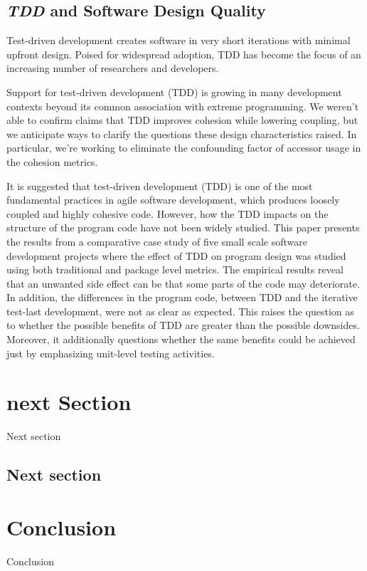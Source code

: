 \documentclass{article}
\begin{document}
\subsection{\textit{TDD} and Software Design Quality}

Test-driven development creates software \cite{TestDrivenDevelopmentConceptsTaxonomy} in very short iterations with minimal upfront design. Poised for widespread adoption, TDD has become the focus of an increasing number of researchers and developers.

Support for test-driven development (TDD) is growing in many development contexts beyond its common association with extreme programming.  We \cite{TestDrivenDevelopmentReallyImproveSoftwareDesign} weren't able to confirm claims that TDD improves cohesion while lowering coupling, but we anticipate ways to clarify the questions these design characteristics raised. In particular, we're working to eliminate the confounding factor of accessor usage in the cohesion metrics.

It is suggested \cite{DoesTestDrivenDevelopmentImprovetheProgramCode} that test-driven development (TDD) is one of the most fundamental practices in agile software development, which produces loosely coupled and highly cohesive code. However, how the TDD impacts on the structure of the program code have not been widely studied. This paper presents the results from a comparative case study of five small scale software development projects where the effect of TDD on program design was studied using both traditional and package level metrics. The empirical results reveal that an unwanted side effect can be that some parts of the code may deteriorate. In addition, the differences in the program code, between TDD and the iterative test-last development, were not as clear as expected. This raises the question as to whether the possible benefits of TDD are greater than the possible downsides. Moreover, it additionally questions whether the same benefits could be achieved just by emphasizing unit-level testing activities.

\section{next Section }

Next section

\subsection{Next section}


\section{Conclusion}

Conclusion




\newpage

 

\end{document}
